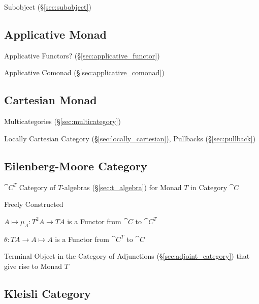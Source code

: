 Subobject (\S\ref{sec:subobject})



\subsection{Applicative Monad}\label{sec:applicative_monad}

Applicative Functors? (\S\ref{sec:applicative_functor})

Applicative Comonad (\S\ref{sec:applicative_comonad})



\subsection{Cartesian Monad}\label{sec:cartesian_monad}

Multicategories (\S\ref{sec:multicategory})

Locally Cartesian Category (\S\ref{sec:locally_cartesian}), Pullbacks
(\S\ref{sec:pullback})



\subsection{Eilenberg-Moore Category}\label{sec:eilenberg_moore}

$\cat{C}^T$ Category of $T$-algebras (\S\ref{sec:t_algebra}) for
Monad $T$ in Category $\cat{C}$

Freely Constructed

$A \mapsto \mu_A : T^2 A \rightarrow T A$ is a Functor from
$\cat{C}$ to $\cat{C}^T$

$\theta : T A \rightarrow A \mapsto A$ is a Functor from
$\cat{C}^T$ to $\cat{C}$

Terminal Object in the Category of Adjunctions
(\S\ref{sec:adjoint_category}) that give rise to Monad $T$



\subsection{Kleisli Category}\label{sec:kleisli_category}

